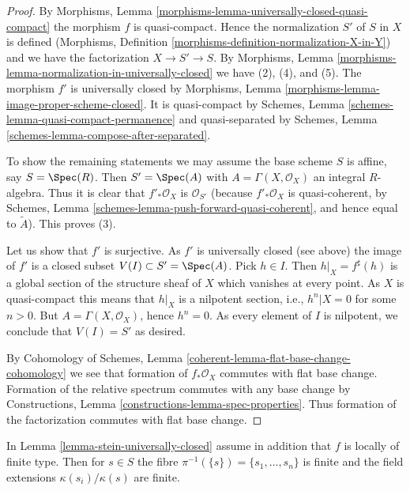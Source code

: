 \begin{proof}
By Morphisms, Lemma \ref{morphisms-lemma-universally-closed-quasi-compact}
the morphism $f$ is quasi-compact. Hence the normalization $S'$ of $S$ in
$X$ is defined (Morphisms, Definition
\ref{morphisms-definition-normalization-X-in-Y})
and we have the factorization $X \to S' \to S$. By
Morphisms, Lemma \ref{morphisms-lemma-normalization-in-universally-closed}
we have (2), (4), and (5). The morphism $f'$ is universally closed by
Morphisms, Lemma \ref{morphisms-lemma-image-proper-scheme-closed}.
It is quasi-compact by
Schemes, Lemma \ref{schemes-lemma-quasi-compact-permanence}
and quasi-separated by
Schemes, Lemma \ref{schemes-lemma-compose-after-separated}.

\medskip\noindent
To show the remaining statements we may assume the base scheme $S$ is affine,
say $S = \Spec(R)$. Then $S' = \Spec(A)$ with
$A = \Gamma(X, \mathcal{O}_X)$ an integral $R$-algebra.
Thus it is clear that $f'_*\mathcal{O}_X$
is $\mathcal{O}_{S'}$ (because $f'_*\mathcal{O}_X$ is quasi-coherent,
by
Schemes, Lemma
\ref{schemes-lemma-push-forward-quasi-coherent},
and hence equal to $\widetilde{A}$). This proves (3).

\medskip\noindent
Let us show that $f'$ is surjective. As $f'$ is universally closed (see above)
the image of $f'$ is a closed subset
$V(I) \subset S' = \Spec(A)$. Pick $h \in I$. Then
$h|_X = f^\sharp(h)$ is a global section of the structure sheaf of
$X$ which vanishes at every point. As $X$ is quasi-compact this means
that $h|_X$ is a nilpotent section, i.e., $h^n|X = 0$ for some $n > 0$.
But $A = \Gamma(X, \mathcal{O}_X)$, hence $h^n = 0$.
As every element of $I$ is nilpotent, we conclude that $V(I) = S'$ as desired.

\medskip\noindent
By Cohomology of Schemes, Lemma \ref{coherent-lemma-flat-base-change-cohomology}
we see that formation of $f_*\mathcal{O}_X$ commutes with flat base change.
Formation of the relative spectrum commutes with any base change by
Constructions, Lemma \ref{constructions-lemma-spec-properties}.
Thus formation of the factorization commutes with flat base change.
\end{proof}

\begin{lemma}
\label{lemma-stein-universally-closed-residue-fields}
In Lemma \ref{lemma-stein-universally-closed} assume in addition that
$f$ is locally of finite type. Then for $s \in S$ the fibre
$\pi^{-1}(\{s\}) = \{s_1, \ldots, s_n\}$ is finite and the field extensions
$\kappa(s_i)/\kappa(s)$ are finite.
\end{lemma}

